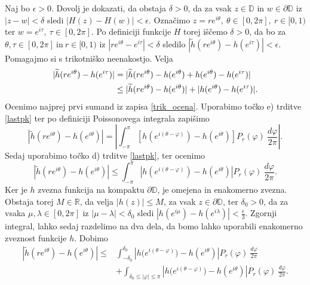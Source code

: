 \documentclass[mat1, tisk]{fmfdelo}
\begin{document}
\begin{dokaz}
        Naj bo $\epsilon >0$. Dovolj je dokazati, da obstaja $\delta >0$, da za vsak $z \in \mathbb{D}$ in $w \in \partial \mathbb{D}$ iz $|z - w| < \delta$ sledi $|H(z) - H(w)| < \epsilon$. 
        Označimo $z = r e^{i \theta},~\theta \in [0,2\pi],~r \in [0,1)$ ter $w = e^{i \tau},~\tau \in [0,2\pi]$.
        Po definiciji funkcije $H$ torej iščemo $\delta >0$, da bo za $\theta, \tau \in [0,2\pi]~\text{in}~r \in [0,1)$ iz $|r e^{i \theta} - e^{i\tau}| < \delta$ sledilo $|\widetilde{h}(r e^{i \theta}) - h(e^{i\tau})| < \epsilon$.
        Pomagajmo si s trikotniško neenakostjo. Velja
        \begin{align}
            \label{trik_ocena}
            |\widetilde{h}(r e^{i \theta}) - h(e^{i\tau})| &= |\widetilde{h}(r e^{i \theta}) - h(e^{i \theta}) + h(e^{i \theta}) - h(e^{i\tau})| \notag \\
            &\leq |\widetilde{h}(r e^{i \theta}) - h(e^{i\theta})| + |h(e^{i\theta}) - h(e^{i\tau})|.
        \end{align}
        Ocenimo najprej prvi sumand iz zapisa \eqref{trik_ocena}. Uporabimo točko e) trditve \ref{lastpk} ter po definiciji Poissonovega integrala zapišimo
        $$
            \left|\widetilde{h}(r e^{i \theta}) - h(e^{i\theta})\right| = \left|\int_{-\pi}^{\pi}{\left[h\left(e^{i(\theta - \varphi)}\right) - h\left(e^{i\theta}\right)\right]P_r(\varphi)~\frac{d\varphi}{2 \pi}}\right|.
        $$
        Sedaj uporabimo točko d) trditve \ref{lastpk}, ter ocenimo
        $$
        \left|\widetilde{h}(r e^{i \theta}) - h(e^{i\theta})\right| \leq \int_{-\pi}^{\pi}{\left| h\left(e^{i(\theta - \varphi)}\right) - h \left(e^{i\theta}\right) \right|P_r(\varphi)~\frac{d\varphi}{2 \pi}}.
        $$ 
        Ker je $h$ zvezna funkcija na kompaktu $\partial \mathbb{D}$, je omejena in enakomerno zvezna.  
        Obstaja torej $M \in \mathbb{R}$, da velja $|h(z)| \leq M$, za vsak $z \in \partial \mathbb{D}$, ter $\delta_0 >0$, da za vsaka $\mu, \lambda \in [0,2\pi]$ iz $|\mu - \lambda| < \delta_0$ sledi $|h(e^{i \mu}) - h(e^{i \lambda})| < \frac{\epsilon}{3}$.
        Zgornji integral, lahko sedaj razdelimo na dva dela, da bomo lahko uporabili enakomerno zveznost funkcije $h$. Dobimo
        \begin{align*}
            \left|\widetilde{h}(re^{i\theta}) - h(e^{i\theta})\right| \leq & \int_{-\delta_0}^{\delta_0}{\left| h\big(e^{i(\theta - \varphi)}\big) - h(e^{i\theta})\right|P_r(\varphi)~\frac{d\varphi}{2\pi}}\\
            & + \int_{\delta_0 \leq |\varphi| \leq \pi}{\left| h\big(e^{i(\theta - \varphi)}\big) - h(e^{i\theta})\right|P_r(\varphi)~\frac{d\varphi}{2\pi}}.

\end{align*}
\end{dokaz}
\end{document}
